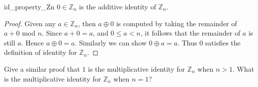 \begin{prop}{id_property_Zn}
$0 \in {\mathbb Z}_n$ is the additive identity of ${\mathbb Z}_n$.
\end{prop}
\begin{proof} Given any $a \in {\mathbb Z}_n$, then $a \oplus 0$ is computed by taking the remainder of $a + 0$  mod $n$. Since $a + 0 = a$, and $0 \leq a < n$, it follows that the remainder of $a$  is still $a$. Hence $a \oplus 0 = a $. Similarly we can show $0 \oplus a = a $. Thus $0$ satisfies the definition of identity for ${\mathbb Z}_n$.
\end{proof}

\begin{exercise}{56}
Give a similar proof that $1$ is the multiplicative identity for ${\mathbb Z}_n$ when $n >1$. What is the multiplicative identity for ${\mathbb Z}_n$ when $n=1$?
\end{exercise}







